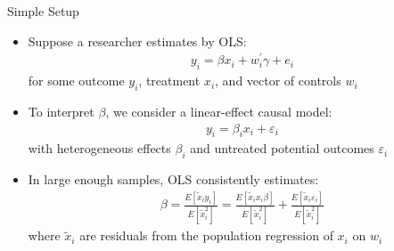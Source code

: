 \documentclass[11pt,english]{beamer}
\begin{document}
\begin{frame}{Simple Setup}
\begin{itemize}
\item Suppose a researcher estimates by OLS:
\begin{align*}
y_i=\beta x_i + w_i^\prime \gamma + e_i
\end{align*}
for some outcome $y_i$, treatment $x_i$, and vector of controls $w_i$\bigskip\pause{}
\item To interpret $\beta$, we consider a linear-effect causal model:
\begin{align*}
y_i = \beta_i x_i + \varepsilon_i
\end{align*}
with heterogeneous effects $\beta_i$ and untreated potential outcomes $\varepsilon_i$\medskip\pause{}
\item In large enough samples, OLS consistently estimates:
\begin{align*}
\beta = \frac{E[\tilde{x}_i y_i]}{E[\tilde{x}_i^2]}=\frac{E[\tilde{x}_i x_i\beta]}{E[\tilde{x}_i^2]}+\frac{E[\tilde{x}_i\varepsilon_i]}{E[\tilde{x}_i^2]}
\end{align*}
where $\tilde{x}_i$ are residuals from the population regression of $x_i$ on $w_i$
\end{itemize}
\end{frame}
\end{document}
